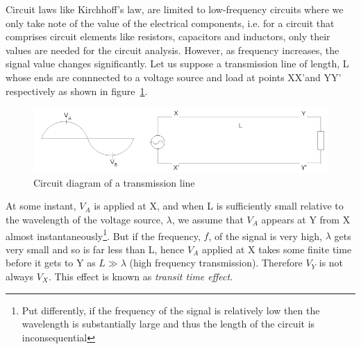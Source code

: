 Circuit laws like Kirchhoff’s law, are limited to low-frequency circuits where we only take note of the value of the electrical components, i.e. for a circuit that comprises circuit elements like resistors, capacitors and inductors, only their values are needed for the circuit analysis. However, as frequency increases, the signal value changes significantly. Let us suppose a transmission line of length, L whose ends are connnected to a voltage source and load at points XX'and YY' respectively as shown in figure~\ref{fig:first}.
\begin{figure}[h]
\centering
\includegraphics[width=1\linewidth]{./graphics/first}
\caption{Circuit diagram of a transmission line}
\label{fig:first}
\end{figure}

At some instant, $ V_{A} $ is applied at X, and when L is sufficiently small relative to the wavelength of the voltage source, $\lambda$, we assume that $ V_{A} $ appears at Y from X almost instantaneously\footnote{Put differently, if the frequency of the signal is relatively low then the wavelength is substantially large and thus the length of the circuit is inconsequential}. But if the frequency, $f$, of the signal is very high, $\lambda $ gets very small and so is far less than L, hence  $  V_{A} $ applied at X takes some finite time before it gets to Y as $  L\gg \lambda $ (high frequency transmission). Therefore $  V_{Y} $ is not always $  V_{X} $. This effect is known as \textit{transit time effect}.

